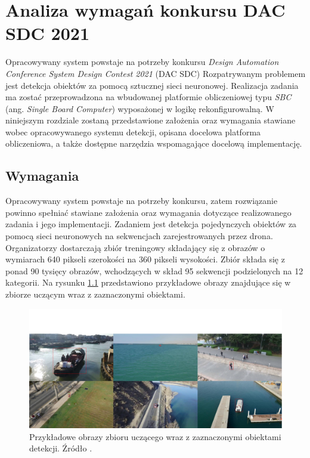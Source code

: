 \chapter{Analiza wymagań konkursu DAC SDC 2021}
\label{cha:Analiza probemu}

Opracowywany system powstaje na potrzeby konkursu \emph{Design Automation Conference System Design Contest 2021} (DAC SDC)
Rozpatrywanym problemem jest detekcja obiektów za pomocą sztucznej sieci neuronowej.
Realizacja zadania ma zostać przeprowadzona na wbudowanej platformie obliczeniowej typu \emph{SBC} (ang. \emph{Single Board Computer}) wyposażonej w logikę rekonfigurowalną.
W niniejszym rozdziale zostaną przedstawione założenia oraz wymagania stawiane wobec opracowywanego systemu detekcji, opisana docelowa platforma obliczeniowa, 
a także dostępne narzędzia wspomagające docelową implementację.


\section{Wymagania}
Opracowywany system powstaje na potrzeby konkursu, zatem rozwiązanie powinno spełniać stawiane założenia oraz wymagania dotyczące realizowanego zadania i jego implementacji.
Zadaniem jest detekcja pojedynczych obiektów za pomocą sieci neuronowych na sekwencjach zarejestrowanych przez drona.
Organizatorzy dostarczają zbiór treningowy składający się z obrazów o wymiarach 640 pikseli szerokości na 360 pikseli wysokości. Zbiór składa się z ponad 90 tysięcy obrazów, wchodzących w skład 95 sekwencji podzielonych na 12 kategorii. Na rysunku \ref{fig:sample_images} przedstawiono przykładowe obrazy znajdujące się w zbiorze uczącym wraz z zaznaczonymi obiektami.
\begin{figure}
    \centering
    \includegraphics[width=\linewidth]{images/sample_images.png}
    \caption{Przykładowe obrazy zbioru uczącego wraz z zaznaczonymi obiektami detekcji. Źródło \cite{dac_sdc_2021}.}
    \label{fig:sample_images}
\end{figure}

